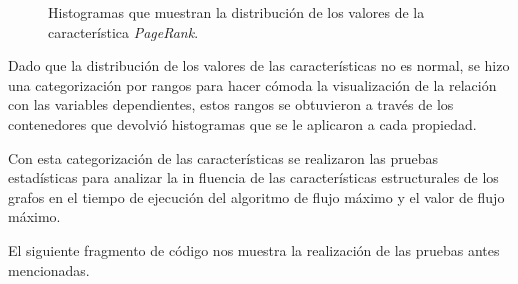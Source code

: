 \documentclass{article}
\begin{document}
\begin{figure}[htbp]

\caption{Histogramas que muestran la distribución de los valores de la característica \textit{PageRank}. }
\label{fig12} 
\end{figure}
Dado que la distribución de los valores de las características no es normal, se hizo una categorización por rangos para hacer cómoda la visualización de la relación con las variables dependientes, estos rangos se obtuvieron a través de los contenedores que devolvió histogramas que se le aplicaron a cada propiedad.

Con esta categorización de las características se realizaron las pruebas estadísticas para analizar la in fluencia de las características estructurales de los grafos en el tiempo de ejecución del algoritmo de flujo máximo y el valor de flujo máximo.

El siguiente fragmento de código nos muestra la realización de las pruebas antes mencionadas.

 
\begin{center}

\end{center}
\end{document}
